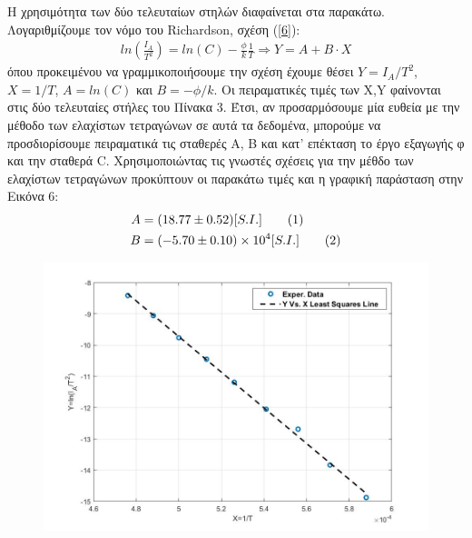 \documentclass[a4paper]{article}
\newcommand\numberthis{\addtocounter{equation}{1}\tag{\theequation}}
\begin{document}
Η χρησιμότητα των δύο τελευταίων στηλών διαφαίνεται στα παρακάτω. 
Λογαριθμίζουμε τον νόμο του Richardson, σχέση (\ref{6}): 
\begin{align*}
ln(\frac{I_A}{T^2}) = ln(C) -\frac{\phi}{k}\frac{1}{T}\Rightarrow Y = A + B\cdot X 
\end{align*}
όπου προκειμένου να γραμμικοποιήσουμε την σχέση έχουμε θέσει $Y=I_A/T^2$, $X=1/T$, $A=ln(C)$ και $B=-\phi/k$. Οι πειραματικές τιμές των X,Y φαίνονται στις δύο τελευταίες στήλες του Πίνακα 3. Έτσι, αν προσαρμόσουμε μία ευθεία με την μέθοδο των ελαχίστων τετραγώνων σε αυτά τα δεδομένα, μπορούμε να προσδιορίσουμε πειραματικά τις σταθερές A, Β και κατ' επέκταση το έργο εξαγωγής φ και την σταθερά C. Χρησιμοποιώντας τις γνωστές σχέσεις για την μέθδο των ελαχίστων τετραγώνων προκύπτουν οι παρακάτω τιμές και η γραφική παράσταση στην Εικόνα 6: 
\begin{align*}
A &= (18.77\pm0.52)[S.I.] \numberthis \\
B &= (-5.70\pm0.10)\times10^4[S.I.] \numberthis
\end{align*}

\begin{figure}[h!]
\centering
\caption{ }
\includegraphics[scale=0.35]{richard.jpg}
\end{figure}
\end{document}
